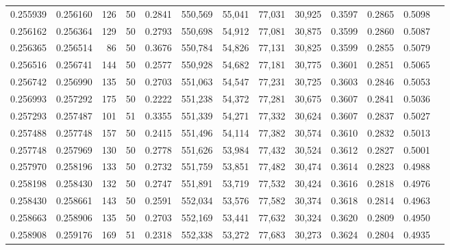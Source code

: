 \begin{tabular}{rrrrrrrrrrrrr}
0.255939 & 0.256160 &   126 &  50 &                                     0.2841 & 550,569 &  55,041 &  77,031 &  30,925 & 0.3597 & 0.2865 & 0.5098 \\
0.256162 & 0.256364 &   129 &  50 &                                     0.2793 & 550,698 &  54,912 &  77,081 &  30,875 & 0.3599 & 0.2860 & 0.5087 \\
0.256365 & 0.256514 &    86 &  50 &                                     0.3676 & 550,784 &  54,826 &  77,131 &  30,825 & 0.3599 & 0.2855 & 0.5079 \\
0.256516 & 0.256741 &   144 &  50 &                                     0.2577 & 550,928 &  54,682 &  77,181 &  30,775 & 0.3601 & 0.2851 & 0.5065 \\
0.256742 & 0.256990 &   135 &  50 &                                     0.2703 & 551,063 &  54,547 &  77,231 &  30,725 & 0.3603 & 0.2846 & 0.5053 \\
0.256993 & 0.257292 &   175 &  50 &                                     0.2222 & 551,238 &  54,372 &  77,281 &  30,675 & 0.3607 & 0.2841 & 0.5036 \\
0.257293 & 0.257487 &   101 &  51 &                                     0.3355 & 551,339 &  54,271 &  77,332 &  30,624 & 0.3607 & 0.2837 & 0.5027 \\
0.257488 & 0.257748 &   157 &  50 &                                     0.2415 & 551,496 &  54,114 &  77,382 &  30,574 & 0.3610 & 0.2832 & 0.5013 \\
0.257748 & 0.257969 &   130 &  50 &                                     0.2778 & 551,626 &  53,984 &  77,432 &  30,524 & 0.3612 & 0.2827 & 0.5001 \\
0.257970 & 0.258196 &   133 &  50 &                                     0.2732 & 551,759 &  53,851 &  77,482 &  30,474 & 0.3614 & 0.2823 & 0.4988 \\
0.258198 & 0.258430 &   132 &  50 &                                     0.2747 & 551,891 &  53,719 &  77,532 &  30,424 & 0.3616 & 0.2818 & 0.4976 \\
0.258430 & 0.258661 &   143 &  50 &                                     0.2591 & 552,034 &  53,576 &  77,582 &  30,374 & 0.3618 & 0.2814 & 0.4963 \\
0.258663 & 0.258906 &   135 &  50 &                                     0.2703 & 552,169 &  53,441 &  77,632 &  30,324 & 0.3620 & 0.2809 & 0.4950 \\
0.258908 & 0.259176 &   169 &  51 &                                     0.2318 & 552,338 &  53,272 &  77,683 &  30,273 & 0.3624 & 0.2804 & 0.4935 \\

\end{tabular}
